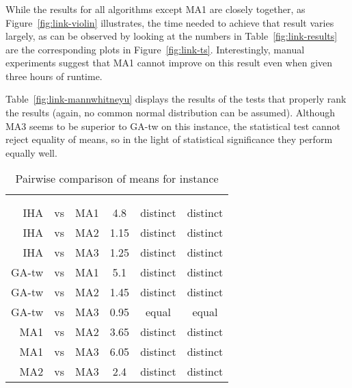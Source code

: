 \documentclass[thesis.tex]{subfiles}
\begin{document}
\subsubsection{}
   \renewcommand{\CurrentInstance}{\Instance{link}}
   \renewcommand{\CurrentInstanceFileEscaped}{link}
   \renewcommand{\CurrentInstanceTexEscaped}{link}



While the results for all algorithms except \gls{MA1} are closely together, as Figure~\vref{fig:link-violin} illustrates, the time needed to achieve that result varies largely, as can be observed by looking at the numbers in Table~\vref{fig:link-results} are the corresponding plots in Figure~\vref{fig:link-ts}. Interestingly, manual experiments suggest that \gls{MA1} cannot improve on this result even when given three hours of runtime.

Table~\vref{fig:link-mannwhitneyu} displays the results of the tests that properly rank the results (again, no common normal distribution can be assumed). Although \gls{MA3} seems to be superior to \gls{GA-tw} on this instance, the statistical test cannot reject equality of means, so in the light of statistical significance they perform equally well.
\begin{table}[htbp]
   \caption{Pairwise comparison of means for instance \CurrentInstance}
   \label{fig:\CurrentInstanceFileEscaped-mannwhitneyu}
   \centering\small
      \begin{tabular}{r@{\ }c@{\ }l S[table-format=2.2] c c} \toprule
         &&&                          &  \\ \cmidrule(lr){5-6}
         &&&  &  &  \\ \midrule

         \gls{IHA} &vs& \gls{MA1}   &  4.8  & distinct & distinct \\
         \gls{IHA} &vs& \gls{MA2}   &  1.15 & distinct & distinct \\
         \gls{IHA} &vs& \gls{MA3}   &  1.25 & distinct & distinct \\
         \gls{GA-tw} &vs& \gls{MA1} &  5.1  & distinct & distinct \\
         \gls{GA-tw} &vs& \gls{MA2} &  1.45 & distinct & distinct \\
         \gls{GA-tw} &vs& \gls{MA3} &  0.95 &  equal   &  equal   \\
         \gls{MA1} &vs& \gls{MA2}   &  3.65 & distinct & distinct \\
         \gls{MA1} &vs& \gls{MA3}   &  6.05 & distinct & distinct \\
         \gls{MA2} &vs& \gls{MA3}   &  2.4  & distinct & distinct \\
         \bottomrule
      \end{tabular}
\end{table}
\end{document}
